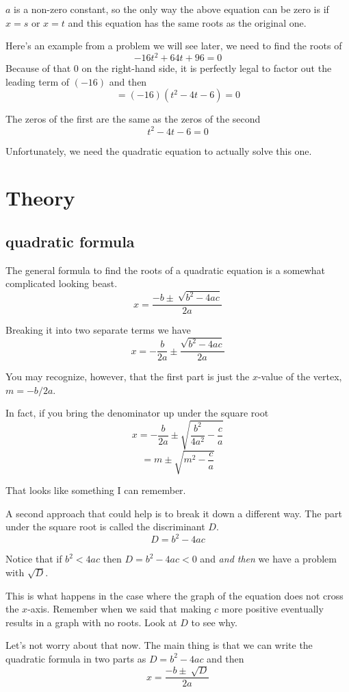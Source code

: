 \documentclass[11pt, oneside]{article}
\begin{document}
$a$ is a non-zero constant, so the only way the above equation can be zero is if $x = s$ or $x = t$ and this equation has the same roots as the original one.

Here's an example from a problem we will see later, we need to find the roots of
\[ -16t^2 + 64t + 96 = 0 \]
Because of that $0$ on the right-hand side, it is perfectly legal to factor out the leading term of $(-16)$ and then
\[ = (-16) (t^2 - 4t - 6) = 0 \]

The zeros of the first are the same as the zeros of the second
\[ t^2 - 4t - 6 = 0 \]

Unfortunately, we need the quadratic equation to actually solve this one.

\section*{Theory}

\subsection*{quadratic formula}

The general formula to find the roots of a quadratic equation is a somewhat complicated looking beast.
\[ x = \frac{-b \pm \ \sqrt{b^2 - 4ac}}{2a} \]

Breaking it into two separate terms we have
\[ x = - \frac{b}{2a} \pm \frac{\sqrt{b^2 - 4ac}}{2a} \]


You may recognize, however, that the first part is just the $x$-value of the vertex, $m = -b/2a$.

In fact, if you bring the denominator up under the square root
\[ x =  - \frac{b}{2a} \pm \sqrt{\frac{b^2}{4a^2} - \frac{c}{a}} \]
\[ = m \pm \sqrt{m^2 - \frac{c}{a}} \]

That looks like something I can remember.

A second approach that could help is to break it down a different way.  The part under the square root is called the discriminant $D$.
\[ D = b^2 - 4ac \]

Notice that if $b^2 < 4ac$ then $D = b^2 - 4ac < 0$ and \emph{and then} we have a problem with $\sqrt{D}$.  

This is what happens in the case where the graph of the equation does not cross the $x$-axis.  Remember when we said that making $c$ more positive eventually results in a graph with no roots.  Look at $D$ to see why.

Let's not worry about that now.  The main thing is that we can write the quadratic formula in two parts as $D = b^2 - 4ac$ and then
\[ x = \frac{- b \pm \ \sqrt{D}}{2a} \]
\end{document}
